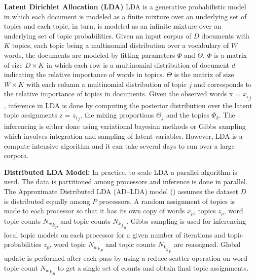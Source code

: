 \noindent \textbf{Latent Dirichlet Allocation (LDA)}
LDA is a generative probabilistic model in which each document is modeled as a finite mixture over an underlying set of topics and each topic, in turn, is modeled as an infinite mixture over an underlying set of topic probabilities\cite{blei2003latent}. %
Given an input corpus of $D$ documents with $K$ topics, each topic being a multinomial distribution over a vocabulary of  $W$ words, the documents are modeled by fitting parameters ${\Phi}$ and ${\Theta}$. ${\Phi}$ is a matrix of size $D \times K$ in which each row is a multinomial distribution of document $d$  indicating the relative importance of words in topics. ${\Theta}$ is the matrix of size $W \times K$ with each column a multinomial distribution of topic $j$ and corresponds to the relative importance of topics in documents. Given the observed words x = ${x_i}_j$, inference in LDA is done by computing the
posterior distribution over the latent topic assignments z = ${z_i}_j$, the mixing proportions ${\Theta_j}$  and the
topics ${\Phi_k}$.  The inferencing is either done using variational bayesian methods or Gibbs sampling which involves integration and sampling of latent variables.
However, LDA is a compute intensive algorithm and it can take several days to run over a large corpora.

\noindent \textbf{Distributed LDA Model: } In practice, to scale LDA a parallel algorithm is used. The data is partitioned among processors and inference is done in parallel. 
The Approximate Distributed LDA (AD--LDA) model (\cite{newman2009distributed}) assumes the dataset $D$ is distributed equally among $P$ processors. A random assignment of topics is made to each processor so that it has its own copy of words $x_p$, topics $z_p$, word topic counts ${{{N_w}_k}_p}$ and topic counts ${{{N_k}_j}_p}$. 
Gibbs sampling is used for inferencing local topic models on each processor for a given number of iterations and topic probabilities $z_p$, word topic ${{N_w}_k}_p$ and topic counts ${{N_k}_j}_p$ are reassigned.
Global update is performed after each pass by using a reduce-scatter operation on word topic count ${{N_w}_k}_p$ to get a single set of counts and obtain final topic assignments.

